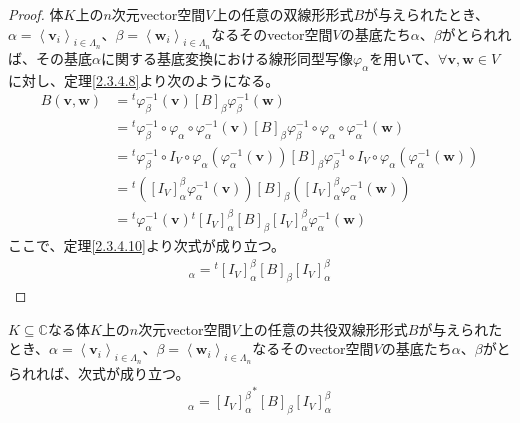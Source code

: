 \documentclass[dvipdfmx]{jsarticle}
\begin{document}
\begin{proof}
体$K$上の$n$次元vector空間$V$上の任意の双線形形式$B$が与えられたとき、$\alpha = \left\langle \mathbf{v}_{i} \right\rangle_{i \in \varLambda_{n}}$、$\beta = \left\langle \mathbf{w}_{i} \right\rangle_{i \in \varLambda_{n}}$なるそのvector空間$V$の基底たち$\alpha$、$\beta$がとられれば、その基底$\alpha$に関する基底変換における線形同型写像$\varphi_{\alpha}$を用いて、$\forall\mathbf{v},\mathbf{w} \in V$に対し、定理\ref{2.3.4.8}より次のようになる。
\begin{align*}
B\left( \mathbf{v},\mathbf{w} \right) &={}^{t}\varphi_{\beta}^{- 1}\left( \mathbf{v} \right)[ B]_{\beta}\varphi_{\beta}^{- 1}\left( \mathbf{w} \right)\\
&={}^{t}\varphi_{\beta}^{- 1} \circ \varphi_{\alpha} \circ \varphi_{\alpha}^{- 1}\left( \mathbf{v} \right)[ B]_{\beta}\varphi_{\beta}^{- 1} \circ \varphi_{\alpha} \circ \varphi_{\alpha}^{- 1}\left( \mathbf{w} \right)\\
&={}^{t}\varphi_{\beta}^{- 1} \circ I_{V} \circ \varphi_{\alpha}\left( \varphi_{\alpha}^{- 1}\left( \mathbf{v} \right) \right)[ B]_{\beta}\varphi_{\beta}^{- 1} \circ I_{V} \circ \varphi_{\alpha}\left( \varphi_{\alpha}^{- 1}\left( \mathbf{w} \right) \right)\\
&={}^{t}\left( \left[ I_{V} \right]^{\beta}_{\alpha}\varphi_{\alpha}^{- 1}\left( \mathbf{v} \right) \right)[ B]_{\beta}\left( \left[ I_{V} \right]^{\beta}_{\alpha}\varphi_{\alpha}^{- 1}\left( \mathbf{w} \right) \right)\\
&={}^{t}\varphi_{\alpha}^{- 1}\left( \mathbf{v} \right){}^{t}\left[ I_{V} \right]^{\beta}_{\alpha}[ B]_{\beta}\left[ I_{V} \right]^{\beta}_{\alpha}\varphi_{\alpha}^{- 1}\left( \mathbf{w} \right)
\end{align*}
ここで、定理\ref{2.3.4.10}より次式が成り立つ。
\begin{align*}
[ B]_{\alpha} ={}^{t}\left[ I_{V} \right]^{\beta}_{\alpha}[ B]_{\beta}\left[ I_{V} \right]^{\beta}_{\alpha}
\end{align*}
\end{proof}
\begin{thm}\label{2.3.4.15}
$K \subseteq \mathbb{C}$なる体$K$上の$n$次元vector空間$V$上の任意の共役双線形形式$B$が与えられたとき、$\alpha = \left\langle \mathbf{v}_{i} \right\rangle_{i \in \varLambda_{n}}$、$\beta = \left\langle \mathbf{w}_{i} \right\rangle_{i \in \varLambda_{n}}$なるそのvector空間$V$の基底たち$\alpha$、$\beta$がとられれば、次式が成り立つ。
\begin{align*}
[ B]_{\alpha} = {\left[ I_{V} \right]^{\beta}_{\alpha}}^{*}[ B]_{\beta}\left[ I_{V} \right]^{\beta}_{\alpha}
\end{align*}
\end{thm}
\end{document}
